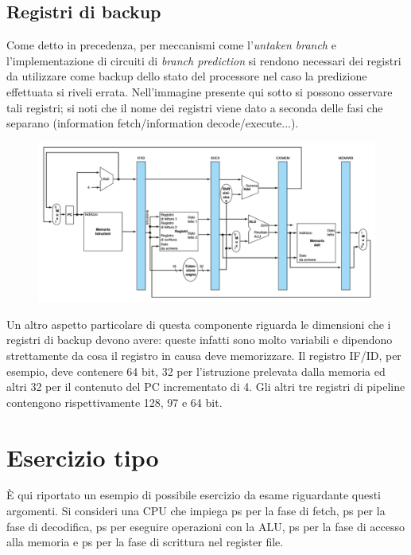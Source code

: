 \documentclass[class=book, crop=false, oneside]{standalone}
\begin{document}
\subsection{Registri di backup}
Come detto in precedenza, per meccanismi come l'\emph{untaken branch} e l'implementazione di circuiti di \emph{branch prediction} si rendono necessari dei registri da utilizzare come backup dello stato del processore nel caso la predizione effettuata si riveli errata. Nell'immagine presente qui sotto si possono osservare tali registri; si noti che il nome dei registri viene dato a seconda delle fasi che separano (information fetch/information decode/execute...).
\begin{figure}[H]
	\centering
	\includegraphics[width=\textwidth,keepaspectratio]{registri-di-backup.png}
\end{figure}
Un altro aspetto particolare di questa componente riguarda le dimensioni che i registri di backup devono avere: queste infatti sono molto variabili e dipendono strettamente da cosa il registro in causa deve memorizzare. Il registro IF/ID, per esempio, deve contenere 64 bit, 32 per l’istruzione prelevata dalla memoria ed altri 32 per il contenuto del PC incrementato di 4. Gli altri tre registri di pipeline contengono rispettivamente 128, 97 e 64 bit.

\section{Esercizio tipo}
È qui riportato un esempio di possibile esercizio da esame riguardante questi argomenti.
Si consideri una CPU che impiega \unit[600]{ps} per la fase di fetch, \unit[600]{ps} per la fase di decodifica, \unit[500]{ps} per eseguire operazioni con la ALU, \unit[400]{ps} per la fase di accesso alla memoria e \unit[700]{ps} per la fase di scrittura nel register file.
\end{document}
